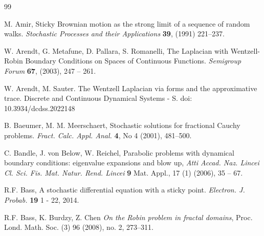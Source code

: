 \documentclass[11pt,a4paper]{article}
\begin{document}

%
%


\begin{thebibliography}{99}


M. Amir,
Sticky Brownian motion as the strong limit of a sequence of random walks.
\textit{Stochastic Processes and their Applications} {\bf 39}, (1991) 221--237.

W. Arendt, G. Metafune, D. Pallara, S. Romanelli,
The Laplacian with Wentzell-Robin Boundary Conditions on Spaces of Continuous Functions.
\textit{Semigroup Forum} {\bf 67}, (2003), 247 -- 261.

W. Arendt, M. Sauter. The Wentzell Laplacian via forms and the approximative trace. Discrete and Continuous Dynamical Systems - S. doi: 10.3934/dcdss.2022148 


B. Baeumer, M. M. Meerschaert,
Stochastic solutions for fractional Cauchy problems.  
\textit{Fract. Calc. Appl. Anal.} \textbf{4}, No 4 (2001), 481--500.

C. Bandle, J. von Below, W. Reichel,
Parabolic problems with dynamical boundary conditions: eigenvalue expansions and blow up,
\textit{Atti Accad. Naz. Lincei Cl. Sci. Fis. Mat. Natur. Rend. Lincei} {\bf 9} Mat. Appl., 17 (1) (2006), 35 -- 67.


R.F. Bass,
A stochastic differential equation with a sticky point. 
\textit{Electron. J. Probab.} \textbf{19} 1 - 22, 2014. 


{\sc R.F. Bass, K. Burdzy, Z. Chen} 
\emph{On the Robin problem in fractal domains}, 
Proc. Lond. Math. Soc. (3) 96 (2008), no. 2, 273--311.



%
%



\end{thebibliography}
\end{document}
